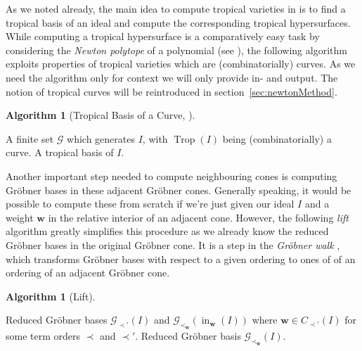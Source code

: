 \documentclass[
  paper=a4,
  titlepage,
  bibliography=totoc,
  listof=totoc,
  pagesize=pdftex
]{scrartcl}
\numberwithin{figure}{section}
\numberwithin{equation}{section}
\numberwithin{table}{section}
\let\vec\mathbf
\DeclareMathOperator{\Trop}{Trop}
\DeclareMathOperator{\initial}{in}
\theoremstyle{definition}
\newtheorem{algo}[definition]{Algorithm}
\numberwithin{definition}{section}
\begin{document}
As we noted already, the main idea to compute tropical varieties in \cite{compTropVar} is
to find a tropical basis of an ideal and compute the corresponding tropical hypersurfaces.
While computing a tropical hypersurface is a comparatively easy task by considering the
\emph{Newton polytope} of a polynomial (see \cite[Algorithm~4.3]{compTropVar}), the
following algorithm exploits properties of tropical varieties which are (combinatorially)
curves. As we need the algorithm only for context we will only provide in- and output. The
notion of tropical curves will be reintroduced in section~\ref{sec:newtonMethod}.

\begin{algo}[Tropical Basis of a Curve, {\cite[Algorihm~4.8]{compTropVar}}]\
  \label{alg:tropBasisCurve}
  \begin{algorithmic}[1]
    \Require A finite set $\mathcal G$ which generates $I$, with $\Trop(I)$ being
      (combinatorially) a curve.
    \Ensure A tropical basis of $I$.
  \end{algorithmic}
\end{algo}

Another important step needed to compute neighbouring cones is computing Gröbner bases in
these adjacent Gröbner cones. Generally speaking, it would be possible to compute these
from scratch if we're just given our ideal $I$ and a weight $\vec w$ in the relative
interior of an adjacent cone. However, the following \emph{lift} algorithm greatly
simplifies this procedure as we already know the reduced Gröbner bases in the original
Gröbner cone. It is a step in the \emph{Gröbner walk} \cite{groebWalk}, which transforms
Gröbner bases with respect to a given ordering to ones of of an ordering of an adjacent
Gröbner cone.
\begin{algo}[Lift] $ $
  \label{alg:lift}
  \begin{algorithmic}[1]
    \Require Reduced Gröbner bases $\mathcal G_{\prec'}(I)$ and $\mathcal G_{\prec_{\vec
      w}}(\initial_{\vec w}(I))$ where $\vec w \in C_{\prec'}(I)$ for some term orders
      $\prec$ and $\prec'$.
    \Ensure Reduced Gröbner basis $\mathcal G_{\prec_{\vec w}}(I)$.
  \end{algorithmic}
\end{algo}

\end{document}
